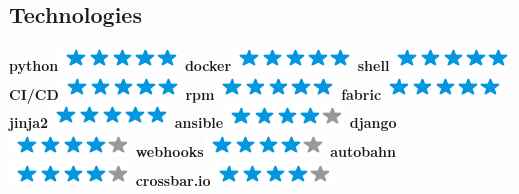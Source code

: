 \documentclass[]{friggeri-cv}
\begin{document}
\begin{aside}
    \section{Technologies}
        \textbf{python}\includegraphics[scale=0.40]{img/5stars.png}
        \textbf{docker}\includegraphics[scale=0.40]{img/5stars.png}
        \textbf{shell}\includegraphics[scale=0.40]{img/5stars.png}
        \textbf{CI/CD}\includegraphics[scale=0.40]{img/5stars.png}
        \textbf{rpm}\includegraphics[scale=0.40]{img/5stars.png}
        \textbf{fabric}\includegraphics[scale=0.40]{img/5stars.png}
        \textbf{jinja2}\includegraphics[scale=0.40]{img/5stars.png}
        \textbf{ansible}\includegraphics[scale=0.40]{img/4stars.png}
        \textbf{django}\includegraphics[scale=0.40]{img/4stars.png}
        \textbf{webhooks}\includegraphics[scale=0.40]{img/4stars.png}
        \textbf{autobahn}\includegraphics[scale=0.40]{img/4stars.png}
        \textbf{crossbar.io}\includegraphics[scale=0.40]{img/4stars.png}

\end{aside}
\end{document}
